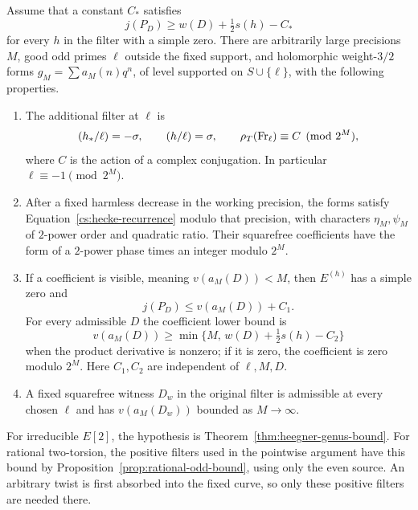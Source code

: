 \begin{proposition}
\label{prop:odd-coefficients}\label{co:odd}
Assume that a constant $C_*$ satisfies
\begin{equation}
              j(P_D)\geq w(D)+\tfrac12s(h)-C_*
\label{cs:odd-bound-hypothesis}
\end{equation}
for every $h$ in the filter with a simple zero.  There are arbitrarily
large precisions $M$, good odd primes $\ell$ outside the fixed support,
and holomorphic weight-$3/2$ forms $g_M=\sum a_M(n)q^n$, of level
supported on $S\cup\{\ell\}$, with the following properties.
\begin{enumerate}[label=\textup{(\roman*)}]
\item The additional filter at $\ell$ is
\begin{equation}
  (h_*/\ell)=-\sigma,\qquad (h/\ell)=\sigma,
               \qquad \rho_T(\operatorname{Fr}_\ell)\equiv C\pmod{2^M},
\label{cs:detecting-prime}
\end{equation}
where $C$ is the action of a complex conjugation.  In particular
$\ell\equiv-1\pmod{2^M}$.
\item After a fixed harmless decrease in the working precision, the
forms satisfy Equation~\eqref{cs:hecke-recurrence} modulo that precision,
with characters $\eta_M,\psi_M$ of $2$-power order and quadratic ratio.
Their squarefree coefficients have the form of a $2$-power phase times
an integer modulo $2^M$.
\item If a coefficient is visible, meaning $v(a_M(D))<M$, then
$E^{(h)}$ has a simple zero and
\begin{equation}
                    j(P_D)\leq v(a_M(D))+C_1.
\label{cs:odd-detection}
\end{equation}
For every admissible $D$ the coefficient lower bound is
\begin{equation}
 v(a_M(D))\geq
       \min\{M,\,w(D)+\tfrac12s(h)-C_2\}
\label{cs:odd-lower-bound}
\end{equation}
when the product derivative is nonzero; if it is zero, the coefficient
is zero modulo $2^M$.  Here $C_1,C_2$ are independent of $\ell,M,D$.
\item A fixed squarefree witness $D_w$ in the original filter is
admissible at every chosen $\ell$ and has $v(a_M(D_w))$ bounded as
$M\to\infty$.
\end{enumerate}
For irreducible $E[2]$, the hypothesis is
Theorem~\ref{thm:heegner-genus-bound}.  For rational two-torsion, the positive filters used in the pointwise
argument have this bound by Proposition~\ref{prop:rational-odd-bound},
using only the even source. An arbitrary twist is first absorbed into
the fixed curve, so only these positive filters are needed there.
\end{proposition}

